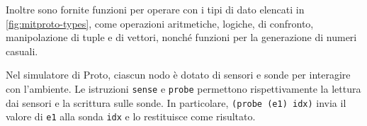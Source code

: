 Inoltre sono fornite funzioni per operare con i tipi di dato elencati in \cref{fig:mitproto-types}, come operazioni aritmetiche, logiche, di confronto, manipolazione di tuple e di vettori, nonché funzioni per la generazione di numeri casuali.



Nel simulatore di Proto, ciascun nodo è dotato di sensori e sonde per interagire con l'ambiente. Le istruzioni \texttt{sense} e \texttt{probe} permettono rispettivamente la lettura dai sensori e la scrittura sulle sonde. In particolare, \texttt{(probe (e1) idx)} invia il valore di \texttt{e1} alla sonda \texttt{idx} e lo restituisce come risultato.


